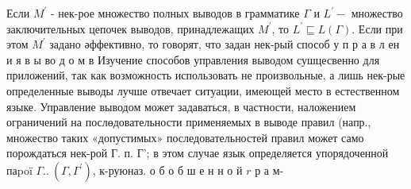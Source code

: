\documentclass[10pt]{article}
\begin{document}
Если $M^{\prime}$ - нек-рое множество полных выводов в грамматике $\Gamma$ и $L^{\prime}-$ множество заключительных цепочек выводов, принадлежащих $M^{\prime}$, то $L^{\prime} \sqsubseteq L(\Gamma)$. Если при этом $M^{\prime}$ задано әффективно, то говорят, что задан нек-рый способ у п р а в л ен и я в ы во д о м в Изучение способов управления выводом сушцесвенно для приложений, так как возможность использовать не произвольные, а лишь нек-рые определенные выводы лучше отвечает ситуации, имеющей место в естественном языке. Управление выводом может задаваться, в частности, наложением ограничений на послөдовательности применяемых в выводе правил (напр., множество таких «допустимых» последовательностей правил может само порождаться нек-рой Г. п. Г'; в этом случае язык определяется упорядоченной паpoï $\Gamma$..$~\left(\Gamma, \Gamma^{\prime}\right)$, к-руюназ. о б о б ш е н н о й $r$ р а м-
\end{document}
